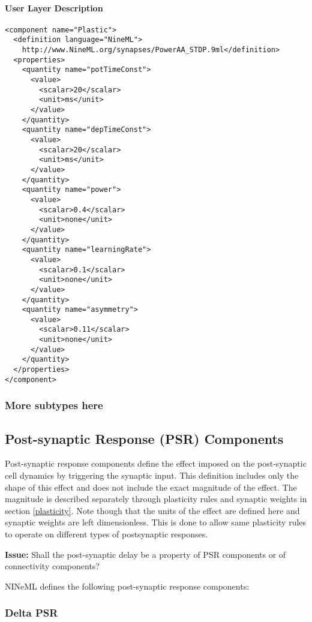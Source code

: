 \documentclass{article}
\newcommand{\issue}[1]{%
\begin{center}
\colorbox{issuecolor}{\parbox{0.8\linewidth}{\textbf{Issue:} #1}}
\end{center}%
}
\begin{document}
\paragraph{User Layer Description}
\begin{verbatim}
<component name="Plastic">
  <definition language="NineML">
    http://www.NineML.org/synapses/PowerAA_STDP.9ml</definition>
  <properties>
    <quantity name="potTimeConst">
      <value>
        <scalar>20</scalar>
        <unit>ms</unit>
      </value>
    </quantity>
    <quantity name="depTimeConst">
      <value>
        <scalar>20</scalar>
        <unit>ms</unit>
      </value>
    </quantity>
    <quantity name="power">
      <value>
        <scalar>0.4</scalar>
        <unit>none</unit>
      </value>
    </quantity>
    <quantity name="learningRate">
      <value>
        <scalar>0.1</scalar>
        <unit>none</unit>
      </value>
    </quantity>
    <quantity name="asymmetry">
      <value>
        <scalar>0.11</scalar>
        <unit>none</unit>
      </value>
    </quantity>
  </properties>
</component>
\end{verbatim}

\subsubsection{More subtypes here}

\subsection{Post-synaptic Response (PSR) Components}
\label{secSynapse}

Post-synaptic response components define the effect imposed on the post-synaptic
cell dynamics by triggering the synaptic input. This definition includes only
the shape of this effect and does not include the exact magnitude of the effect.
The magnitude is described separately through plasticity rules and synaptic
weights in section \ref{plasticity}. Note though that the units of the
effect are defined here and synaptic weights are left dimensionless. This
is done to allow same plasticity rules to operate on different types
of postsynaptic responses.

\issue{Shall the post-synaptic delay be a property of PSR components or of
connectivity components?}

NINeML defines the following post-synaptic response components:

\subsubsection{Delta PSR}
\end{document}
